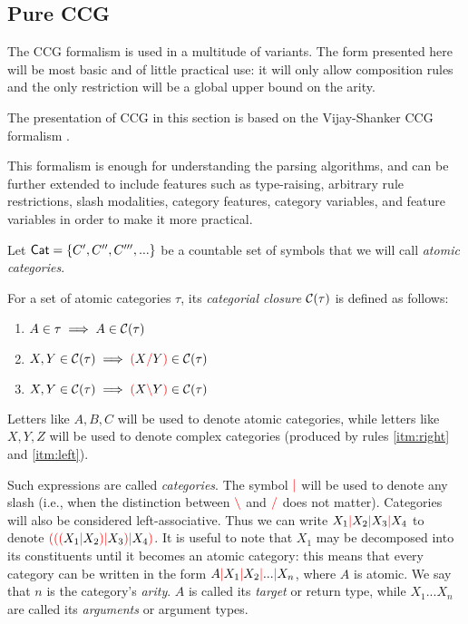 \documentclass[main.tex]{subfiles}
\begin{document}
\subsection{Pure CCG}
\label{sec:ccg}
The CCG formalism is used in a multitude of variants. The form presented here
will be most basic and of little practical use: it will only allow composition
rules and the only restriction will be a global upper bound on the arity.

The presentation of CCG in this section is based on the Vijay-Shanker CCG formalism \cite{shanker}.

This formalism is enough for understanding the
parsing algorithms, and can be further
extended to include features such as type-raising,
arbitrary rule restrictions, slash modalities,
category features, category variables, and feature variables in order to make
it more practical.

Let $\mathsf{Cat} = \{ C', C'', C''', ... \}$ be a countable set of symbols that we will call
\emph{atomic categories}.

\begin{defn}
    For a set of atomic categories $\tau$, its
    \emph{categorial closure} $\mathcal{C}( \tau )$ is defined as follows:
    \begin{enumerate}
        \item \label{itm:atomic} $A \in \tau \implies A \in \mathcal{C}( \tau )$
        \item \label{itm:right}  $X, Y \in \mathcal{C}( \tau ) \implies \textcolor{red}{(} X \textcolor{red}{/} Y \textcolor{red}{)} \in \mathcal{C}( \tau )$
        \item \label{itm:left}   $X, Y \in \mathcal{C}( \tau ) \implies \textcolor{red}{(} X \textcolor{red}{\backslash} Y \textcolor{red}{)} \in \mathcal{C}( \tau )$
    \end{enumerate}

    Letters like $A, B, C$ will be used to denote atomic categories,
    while letters like $X, Y, Z$ will be used to
    denote complex categories (produced by rules \ref{itm:right} and \ref{itm:left}).

    Such expressions are called \emph{categories}. The symbol $\textcolor{red}{|}$ will be
    used to denote any slash (i.e., when the distinction between $\textcolor{red}{\backslash}$ and $\textcolor{red}{/}$
    does not matter). Categories will also be considered left-associative.
    Thus we can write $X_1 \textcolor{red}{|} X_2 \textcolor{red}{|} X_3 \textcolor{red}{|} X_4$ to denote
    $\textcolor{red}{(} \textcolor{red}{(} \textcolor{red}{(} X_1 \textcolor{red}{|} X_2 \textcolor{red}{)} \textcolor{red}{|} X_3 \textcolor{red}{)} \textcolor{red}{|} X_4 \textcolor{red}{)}$. It is useful to note that $X_1$ may
    be decomposed into its constituents until it becomes an atomic category:
    this means that every category can be written in the form
    $A \textcolor{red}{|} X_1 \textcolor{red}{|} X_2 \textcolor{red}{|} ... \textcolor{red}{|} X_n$, where $A$ is atomic. We say that
    $n$ is the category's \emph{arity}. $A$ is called its \emph{target} or
    return type, while
    $X_1 ... X_n$ are called its \emph{arguments} or argument types.
\end{defn}
\end{document}
